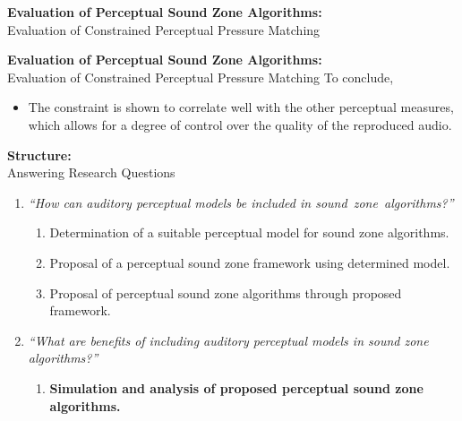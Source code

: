 \documentclass[aspectratio=169]{beamer}
\begin{document}
\begin{frame}{\textbf{Evaluation of Perceptual Sound Zone Algorithms:}\\ Evaluation of Constrained
    Perceptual Pressure Matching}
    \begin{figure}[]
        \centering
        \scalebox{0.55}{}
    \end{figure}
\end{frame}

\begin{frame}{\textbf{Evaluation of Perceptual Sound Zone Algorithms:}\\ Evaluation of Constrained
    Perceptual Pressure Matching}
    To conclude, 
    \begin{itemize}
        \item The constraint is shown to correlate well with the other perceptual measures, which allows for a degree of control over the 
            quality of the reproduced audio.
    \end{itemize}
\end{frame}

\begin{frame}{\textbf{Structure:}\\ Answering Research Questions}
    \begin{enumerate}
        \item {\textit{``How can auditory perceptual models be included in sound~zone~algorithms?''}}
            \vspace{7pt}
            \begin{enumerate}
                \item Determination of a suitable perceptual model for sound zone algorithms.
                \vspace{7pt}
                \item Proposal of a perceptual sound zone framework using determined model. 
                \vspace{7pt}
                \item Proposal of perceptual sound zone algorithms through proposed framework.
                \vspace{7pt}
            \end{enumerate}
        \item {\textit{``What are benefits of including auditory perceptual models in sound zone algorithms?''}}
            \vspace{-5pt}
            \begin{enumerate}
                \item \textbf{Simulation and analysis of proposed perceptual sound zone algorithms.}
            \end{enumerate}
    \end{enumerate}
\end{frame}
\end{document}
